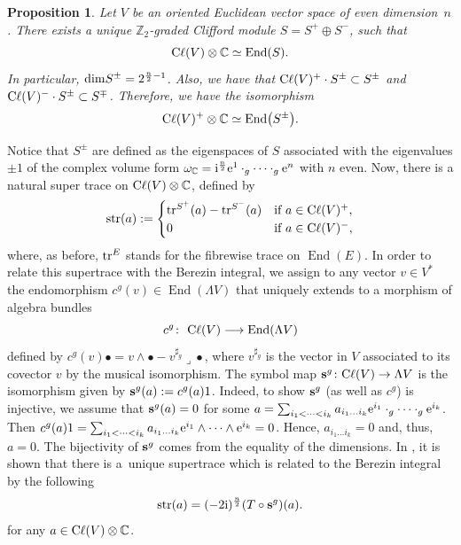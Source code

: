 \documentclass[pdftex]{sigma}
\numberwithin{equation}{section}
\newtheorem{prop}[thm]{Proposition}
\theoremstyle{definition}
\newcommand{\C}{\mathbb C}
\newcommand{\Cl}{{\rm C}\ell}
\begin{document}
\begin{prop} \label{pro:spinorbundle}
Let $V$ be an oriented Euclidean vector space of even dimension~$n$. There exists a unique $\mathbb{Z}_2$-graded Clifford module $S=S^+\oplus S^-$, such that
	\[\Cl(V)\otimes \C\simeq \operatorname{End}(S).\]
	In particular, ${\rm dim} S^\pm=2^{\frac{n}{2}-1}$. Also, we have that $\Cl(V)^+\cdot S^\pm\subset S^\pm$ and $\Cl(V)^-\cdot S^\pm\subset S^\mp$. Therefore, we have the isomorphism \[\Cl(V)^+\otimes \C\simeq \operatorname{End}\bigl(S^\pm\bigr).\]
\end{prop}
Notice that $S^\pm$ are defined as the eigenspaces of $S$ associated with the eigenvalues $\pm 1$ of the complex volume form $\omega_{\mathbb{C}}={\rm i}^{\frac{n}{2}} {\rm e}^1\cdot_g\dots\cdot_g {\rm e}^n$ with $n$ even. Now, there is a natural super trace on $\Cl(V)\otimes \mathbb{C}$, defined by
\begin{equation*}
	{\rm str}(a) :=
	\begin{cases}
		{\rm tr}^{S^+}(a)-{\rm tr}^{S^-}(a) & \text{if $a\in \Cl(V)^+$,}\\
		0 & \text{if $a \in \Cl(V)^-,$}
	\end{cases}
\end{equation*}
where, as before, ${\rm tr}^E$ stands for the fibrewise trace on $\operatorname{End}(E)$. In order to relate this supertrace with the Berezin integral, we assign to any vector $v\in V^*$ the endomorphism $c^g(v)\in \operatorname{End}(\Lambda V) $ that uniquely extends to a morphism of algebra bundles
\begin{equation}\label{eq:cliffend}
c^g\colon \ \Cl(V) \longrightarrow \operatorname{End}(\Lambda V)
\end{equation}
defined by
$	%
	c^g(v)\bullet =v\wedge\bullet -v^{\sharp_g} \lrcorner\bullet$,
where $v^{\sharp_g}$ is the vector in $V$ associated to its covector $v$ by the musical isomorphism. The symbol map ${\bf s}^g\colon \Cl(V)\to \Lambda V$ is the isomorphism given by ${\bf s}^g(a):=c^g(a)1$. Indeed, to show ${\bf s}^g$ (as well as $c^g$) is injective, we assume that ${\bf s}^g(a)=0$ for some $a=\sum_{i_1<\dots<i_k} a_{i_1\dots i_k} {\rm e}^{i_1}\cdot_g\cdots\cdot_g {\rm e}^{i_k}$. Then $c^g(a)1=\sum_{i_1<\dots<i_k} a_{i_1\dots i_k} {\rm e}^{i_1}\wedge\dots\wedge {\rm e}^{i_k}=0$. Hence, $a_{i_1\dots i_k}=0$ and, thus, $a=0$. The bijectivity of ${\bf s}^g$ comes from the equality of the dimensions. In \cite[Proposition~3.21]{BGV}, it is shown that there is a~unique supertrace which is related to the Berezin integral by the following
\begin{equation}\label{eq:supertraceformula}
	{\rm str}(a)=(-2{\rm i})^{\frac{n}{2}}(T\circ {\bf s}^g)(a).
\end{equation}
for any $a\in \Cl(V)\otimes \mathbb{C}$.
\end{document}
